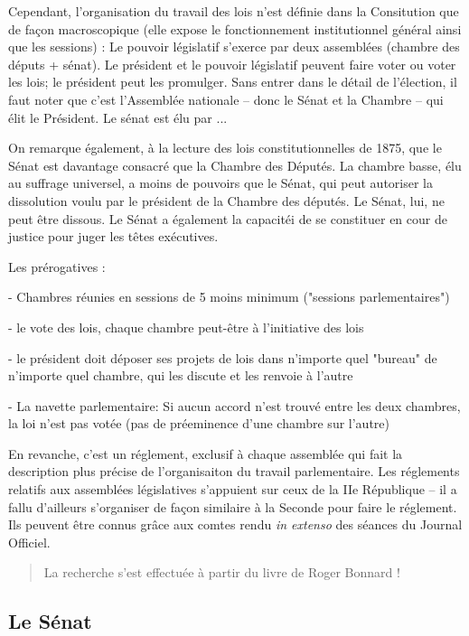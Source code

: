 Cependant, l'organisation du travail des lois n'est définie dans la Consitution que de façon macroscopique (elle expose le fonctionnement institutionnel général ainsi que les sessions) : Le pouvoir législatif s'exerce par deux assemblées (chambre des députs + sénat). Le président et le pouvoir législatif peuvent faire voter ou voter les lois; le président peut les promulger. Sans entrer dans le détail de l'élection, il faut noter que c'est l'Assemblée nationale -- donc le Sénat et la Chambre -- qui élit le Président. Le sénat est élu par ...

On remarque également, à la lecture des lois constitutionnelles de 1875, que le Sénat est davantage consacré que la Chambre des Députés. La chambre basse, élu au suffrage universel, a moins de pouvoirs que le Sénat, qui peut autoriser la dissolution voulu par le président de la Chambre des députés. Le Sénat, lui, ne peut être dissous. Le Sénat a également la capacitéi de se constituer en cour de justice pour juger les têtes exécutives.

Les prérogatives :

- Chambres réunies en sessions de 5 moins minimum ("sessions parlementaires")

- le vote des lois, chaque chambre peut-être à l'initiative des lois

- le président doit déposer ses projets de lois dans n'importe quel "bureau" de n'importe quel chambre, qui les discute et les renvoie à l'autre

- La navette parlementaire: Si aucun accord n'est trouvé entre les deux chambres, la loi n'est pas votée (pas de préeminence d'une chambre sur l'autre)


En revanche, c'est un réglement, exclusif à chaque assemblée qui fait la description plus précise de l'organisaiton du travail parlementaire. Les réglements relatifs aux assemblées législatives s'appuient sur ceux de la IIe République -- il a fallu d'ailleurs s'organiser de façon similaire à la Seconde pour faire le réglement. Ils peuvent être connus grâce aux comtes rendu \textit{in extenso} des séances du Journal Officiel.

\begin{quote} La recherche s'est effectuée à partir du livre de Roger Bonnard !\end{quote}

\subsection{Le Sénat}

